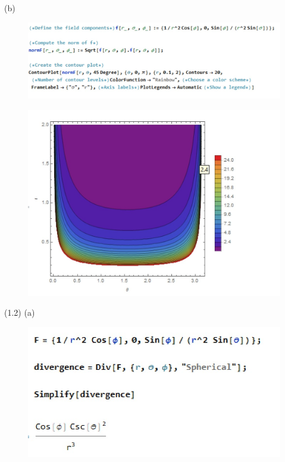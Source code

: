 \documentclass[journal,12pt,onecolumn]{IEEEtran}
\theoremstyle{remark}
\begin{document}
(b)
\begin{figure}[H]
    \centering
     \includegraphics[scale=0.5]{figs/1.2.1.jpeg}
    \caption{}    
    \label{fig:ishitha.em.fig1}
\end{figure}
\begin{figure}[H]
    \centering
     \includegraphics[scale=0.5]{figs/1.2.2.jpeg}
    \caption{}    
    \label{fig:ishitha.em.fig1}
\end{figure}
(1.2) (a) \begin{figure}[H]
    \centering
     \includegraphics[scale=0.5]{figs/div.jpeg}
    \caption{}    
    \label{fig:ishitha.em.fig1}
\end{figure}
\end{document}
